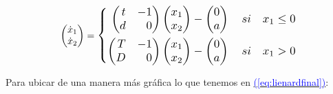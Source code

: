 \documentclass[12pt,a4paper]{report} %
\newcommand{\eref}[1]{\hyperref[#1]{\textcolor{blue}{(\ref*{#1})}}}
\newcommand{\eref}[1]{\hyperref[#1]{\textcolor{blue}{\textit{(\ref*{#1})}}}}
\begin{document}
	
	\begin{equation}
		\begin{pmatrix*}[r]
			\dot{x}_1 \\ \dot{x}_2
		\end{pmatrix*}=
		\label{eq:lienardfinal}
		\scalebox{1.2}{$\displaystyle
			\left\{
			\begin{aligned}
				\begin{pmatrix*}[r]
					t & -1\\
					d & 0
				\end{pmatrix*}\begin{pmatrix*}[r]
					x_1 \\ x_2
				\end{pmatrix*}-\begin{pmatrix}
					0\\a
				\end{pmatrix} \quad si \quad x_1\leq 0 \\
				\begin{pmatrix*}[r]
					T & -1\\
					D & 0
				\end{pmatrix*}\begin{pmatrix*}[r]
					x_1 \\ x_2
				\end{pmatrix*}-\begin{pmatrix}
					0\\a
				\end{pmatrix} \quad si \quad x_1 > 0
			\end{aligned}
			\right. 
			$}
	\end{equation}\smallskip
	
	\noindent Para ubicar de una manera más gráfica lo que tenemos en \eref{eq:lienardfinal}:
	
\end{document}
